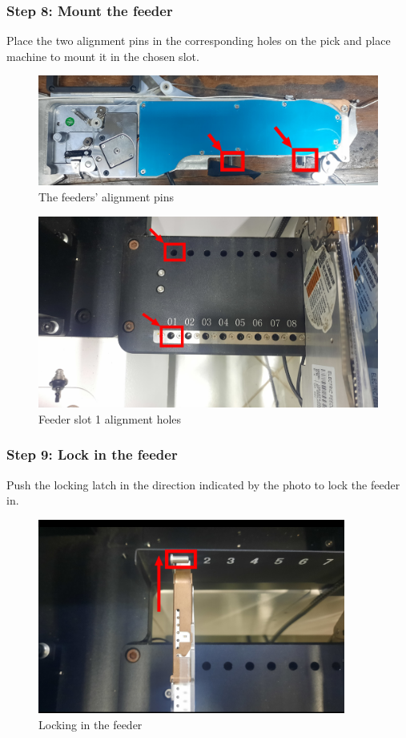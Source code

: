 \documentclass[a4paper,10pt]{report}
\begin{document}
\subsubsection{Step 8: Mount the feeder}
Place the two alignment pins in the corresponding holes on the pick and place machine to mount it in the chosen slot.
\begin{figure}[!htb]
 \centering
 \includegraphics[width=1\textwidth]{alignment_pins.png}
 \caption{The feeders' alignment pins}
\end{figure}
\begin{figure}[!htb]
 \centering
 \includegraphics[width=1\textwidth]{alignment_holes.png}
 \caption{Feeder slot 1 alignment holes}
\end{figure}
\newpage
\subsubsection{Step 9: Lock in the feeder}
Push the locking latch in the direction indicated by the photo to lock the feeder in.
\begin{figure}[!htb]
 \centering
 \includegraphics[width=0.9\textwidth]{step9.png}
 \caption{Locking in the feeder}
\end{figure}
\end{document}
